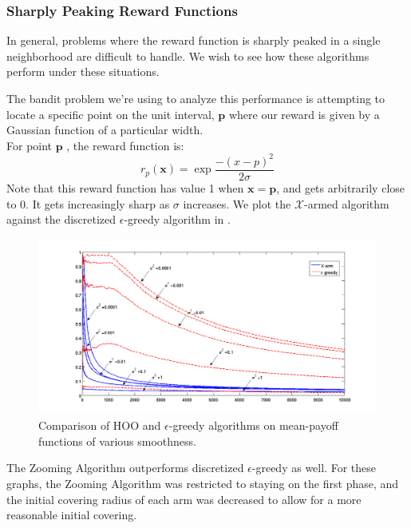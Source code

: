 \subsubsection{Sharply Peaking Reward Functions}
In general, problems where the reward function is sharply peaked in a
single neighborhood are difficult to handle. We wish to see how these
algorithms perform under these situations.

The bandit problem we're using to analyze this performance is
attempting to locate a specific point on the unit interval,
$\mathbf{p}$ where our reward is given by a Gaussian function of a
particular width.\\ For point $\mathbf{p}$ , the reward function is:
\[
	r_p(\mathbf{x}) = \exp{\frac{-(x-p)^2}{2\sigma}}
\]
Note that this reward function has value 1 when $\mathbf{x}
= \mathbf{p}$, and gets arbitrarily close to 0.  It gets increasingly
sharp as $\sigma$ increases.  We plot the $\mathcal{X}$-armed
algorithm against the discretized $\epsilon$-greedy algorithm in
.

\begin{figure}[!ht]
  \begin{center}
    \includegraphics[width=\figwidth]{figures/smoothnessComparison_linear_labelled}
     \caption{Comparison of HOO and $\epsilon$-greedy algorithms on
       mean-payoff functions of various smoothness.}
     \label{fig:smoothness}
  \end{center}
\end{figure}

The Zooming Algorithm outperforms discretized $\epsilon$-greedy as
well.  For these graphs, the Zooming Algorithm was restricted to
staying on the first phase, and the initial covering radius of each
arm was decreased to allow for a more reasonable initial covering.


